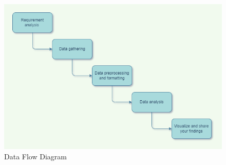 \label{sec:data-flow}
\begin{figure}
	\centering
	\includegraphics[width=1.2\linewidth]{images/DFD.drawio.png}
	\caption{Data Flow Diagram}
	\label{fig:linear-regression}
\end{figure} 